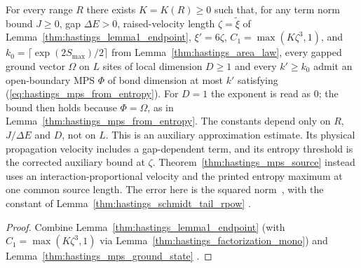 \begin{lemma}
    \label{thm:hastings_mps_gapped_chain}
    \leanok
    For every range $R$ there exists $K=K(R)\ge0$ such that, for any term norm
    bound $J\ge0$, gap $\Delta E>0$, raised-velocity length $\zeta=\tilde\xi$ of
    Lemma~\ref{thm:hastings_lemma1_endpoint}, $\xi'=6\zeta$,
    $C_1=\max(K\zeta^3,1)$, and $k_0=\lceil\exp(2S_{\max})/2\rceil$ from
    Lemma~\ref{thm:hastings_area_law}, every gapped ground vector $\Omega$ on
    $L$ sites of local dimension $D\ge1$ and every $k'\ge k_0$ admit an
    open-boundary MPS $\Phi$ of bond dimension at most $k'$ satisfying
    (\ref{eq:hastings_mps_from_entropy}).
    For $D=1$ the exponent is read as $0$; the bound then holds because
    $\Phi=\Omega$, as in Lemma~\ref{thm:hastings_mps_from_entropy}.
    The constants depend only on $R$, $J/\Delta E$ and $D$, not on $L$.
    This is an auxiliary approximation estimate. Its physical propagation
    velocity includes a gap-dependent term, and its entropy threshold is
    the corrected auxiliary bound at $\zeta$.
    Theorem~\ref{thm:hastings_mps_source} instead uses an
    interaction-proportional velocity and the printed entropy maximum at
    one common source length. The error here is the squared
    norm~\cite{gap:hastings07_mps_error_measure}, with the constant of
    Lemma~\ref{thm:hastings_schmidt_tail_rpow}
    \cite{gap:hastings07_schmidt_tail_constant}.
\end{lemma}
\begin{proof}\leanok
    Combine Lemma~\ref{thm:hastings_lemma1_endpoint} (with
    $C_1=\max(K\zeta^3,1)$ via Lemma~\ref{thm:hastings_factorization_mono})
    and Lemma~\ref{thm:hastings_mps_ground_state}
    \cite{gap:hastings07_mps_entropy_stage}.
\end{proof}

